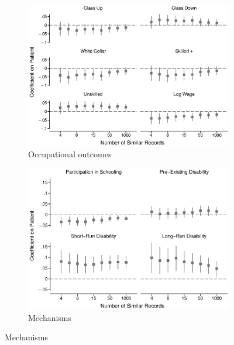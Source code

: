 \documentclass[12pt,english]{article}
\begin{document}
\begin{figure}
\caption[Robustness to changing similar names threshold (JW = 0.1)]{Robustness to changing similar names threshold (JW = 0.1)}
\centering
\begin{subfigure}{0.46\textwidth}
	\centering
	\includegraphics[width=1.0\textwidth]{../output/01_paper/figure_02a.eps}
	\caption{Occupational outcomes}
	\label{fig:sim-10-occupational}
\end{subfigure}
\begin{subfigure}{0.46\textwidth}
	\centering
	\includegraphics[width=1.0\textwidth]{../output/01_paper/figure_02b.eps}
	\caption{Mechanisms}
	\label{fig:sim-10-mechanisms}
\end{subfigure}

\end{figure}
\end{document}
